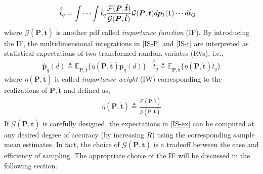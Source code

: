 \documentclass[review]{elsarticle}
\begin{document}
\begin{align}\label{IS-t}    
    \hat{\mathring{t}}_q&=\idotsint \mathring{t}_q \frac{\mathcal{F}(\boldsymbol{P},\mathring{\boldsymbol{t}})}{\mathcal{G}(\boldsymbol{P},\mathring{\boldsymbol{t}})}\mathcal{G}(\boldsymbol{P},\mathring{\boldsymbol{t}})d\boldsymbol{p}_1(1) \cdots d\mathring{t}_Q
\end{align}
where $\mathcal{G}(\boldsymbol{P},\mathring{\boldsymbol{t}})$ is another pdf called \emph{importance function} (IF). By introducing the IF, the multidimensional integrations in \eqref{IS-P} and \eqref{IS-t} are interpreted as statistical expectations of two transformed random variates (RVs), i.e.,
\begin{align}\label{IS-ex}
    \hat{\boldsymbol{p}}_q(d)\triangleq \mathbb{E}_{\boldsymbol{P},\mathring{\boldsymbol{t}}}\{\eta(\boldsymbol{P},\mathring{\boldsymbol{t}})\boldsymbol{p}_q(d)\} \quad \hat{\mathring{t}}_q\triangleq \mathbb{E}_{\boldsymbol{P},\mathring{\boldsymbol{t}}}\{\eta(\boldsymbol{P},\mathring{\boldsymbol{t}})\mathring{t}_q\}
\end{align}
where $\eta(\boldsymbol{P},\mathring{\boldsymbol{t}})$ is called \emph{importance weight} (IW) corresponding to the realizations of $\boldsymbol{P},\mathring{\boldsymbol{t}}$ and defined as,
\begin{align}\label{eta}
    \eta(\boldsymbol{P},\mathring{\boldsymbol{t}})\triangleq\frac{\mathcal{F}(\boldsymbol{P},\mathring{\boldsymbol{t}})}{\mathcal{G}(\boldsymbol{P},\mathring{\boldsymbol{t}})}
\end{align}
If $\mathcal{G}(\boldsymbol{P},\mathring{\boldsymbol{t}})$ is carefully designed, the expectations in \eqref{IS-ex} can be computed at any desired degree of accuracy (by increasing $R$) using the corresponding sample mean estimates. In fact, the choice of $\mathcal{G}(\boldsymbol{P},\mathring{\boldsymbol{t}})$ is a tradeoff between the ease and efficiency of sampling. The appropriate choice of the IF will be discussed in the following section. 
\end{document}
